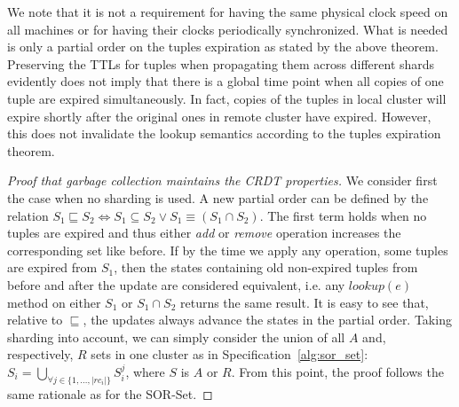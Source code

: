 We note that it is not a requirement for having the same physical clock speed on
all machines or for having their clocks periodically synchronized. What is
needed is only a partial order on the tuples expiration as stated by the above
theorem. Preserving the TTLs for tuples when propagating them across different
shards evidently does not imply that there is a global time point when all
copies of one tuple are expired simultaneously. In fact, copies of the tuples in
local cluster will expire shortly after the original ones in remote cluster have
expired. However, this does not invalidate the lookup semantics according to the
tuples expiration theorem.

\begin{proof}[Proof that garbage collection maintains the CRDT properties]
We consider first the case when no sharding is used. A new partial order can be
defined by the relation $S_{1} \sqsubseteq S_{2} \iff S_{1} \subseteq S_{2} \lor
S_{1} \equiv (S_{1} \cap S_{2})$. The first term holds when no tuples are
expired and thus either \textit{add} or \textit{remove} operation increases the
corresponding set like before. If by the time we apply any operation, some
tuples are expired from $S_{1}$, then the states containing old non-expired
tuples from before and after the update are considered equivalent, i.e. any
$\textit{lookup}(e)$ method on either $S_{1}$ or $S_{1} \cap S_{2}$ returns the
same result. It is easy to see that, relative to $\sqsubseteq$, the updates
always advance the states in the partial order. Taking sharding into account, we
can simply consider the union of all $A$ and, respectively, $R$ sets in one
cluster as in Specification~\ref{alg:sor_set}: $S_{i} = \bigcup_{\forall j \in
\{1,\ldots,|rc_{i}|\}} S_{i}^{j}$, where $S$ is $A$ or $R$. From this point, the
proof follows the same rationale as for the SOR-Set.
\end{proof}